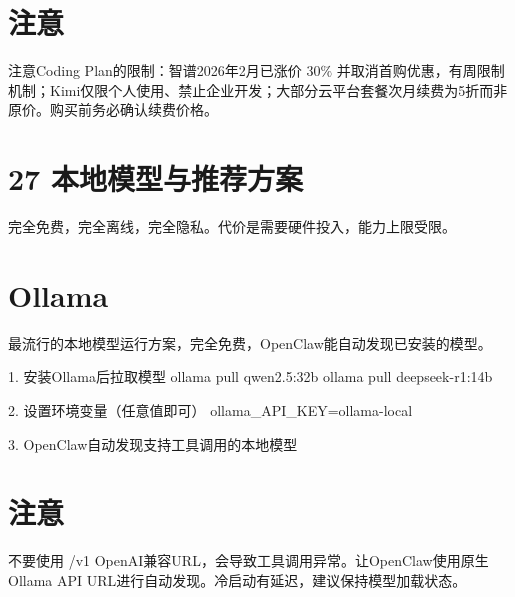 \documentclass[
  10
]{article}
\newenvironment{Shaded}{}{}
\newcommand{\NormalTok}[1]{#1}
\begin{document}
\section{注意}\label{ux6ce8ux610f-19}

注意Coding Plan的限制：智谱2026年2月已涨价 \(3 0 \%\)
并取消首购优惠，有周限制机制；Kimi仅限个人使用、禁止企业开发；大部分云平台套餐次月续费为5折而非原价。购买前务必确认续费价格。

\section{27
本地模型与推荐方案}\label{ux672cux5730ux6a21ux578bux4e0eux63a8ux8350ux65b9ux6848}

完全免费，完全离线，完全隐私。代价是需要硬件投入，能力上限受限。

\section{Ollama}\label{ollama}

最流行的本地模型运行方案，完全免费，OpenClaw能自动发现已安装的模型。

\begin{Shaded}
\begin{Highlighting}[]
\NormalTok{1. 安装Ollama后拉取模型  }
\NormalTok{ollama pull qwen2.5:32b  }
\NormalTok{ollama pull deepseek{-}r1:14b}
\end{Highlighting}
\end{Shaded}

\begin{Shaded}
\begin{Highlighting}[]
\NormalTok{2. 设置环境变量（任意值即可）  }
\NormalTok{ollama\_API\_KEY=ollama{-}local}
\end{Highlighting}
\end{Shaded}

\begin{Shaded}
\begin{Highlighting}[]
\NormalTok{3. OpenClaw自动发现支持工具调用的本地模型}
\end{Highlighting}
\end{Shaded}

\section{注意}\label{ux6ce8ux610f-20}

不要使用 /v1 OpenAI兼容URL，会导致工具调用异常。让OpenClaw使用原生Ollama
API URL进行自动发现。冷启动有延迟，建议保持模型加载状态。
\end{document}
